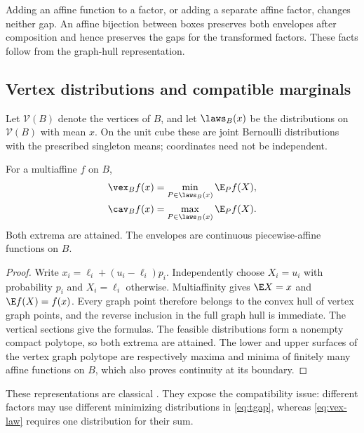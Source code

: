 Adding an affine function to a factor, or adding a separate affine factor,
changes neither gap. An affine bijection between boxes preserves both
envelopes after composition and hence preserves the gaps for the transformed
factors. These facts follow from the graph-hull representation.

\subsection{Vertex distributions and compatible marginals}
Let $\mathcal V(B)$ denote the vertices of $B$, and let $\laws_B(x)$ be
the distributions on $\mathcal V(B)$ with mean $x$. On the unit cube these
are joint Bernoulli distributions with the prescribed singleton means;
coordinates need not be independent.

\begin{lemma}\label{lem:vertex-law}
For a multiaffine $f$ on $B$,
\begin{align}
 \vex_B f(x)&=\min_{P\in\laws_B(x)}\E_P f(X),\label{eq:vex-law}\\
 \cav_B f(x)&=\max_{P\in\laws_B(x)}\E_P f(X).\label{eq:cav-law}
\end{align}
Both extrema are attained. The envelopes are continuous piecewise-affine
functions on $B$.
\end{lemma}
\begin{proof}
Write $x_i=\ell_i+(u_i-\ell_i)p_i$. Independently choose $X_i=u_i$ with
probability $p_i$ and $X_i=\ell_i$ otherwise. Multiaffinity gives
$\E X=x$ and $\E f(X)=f(x)$. Every graph point therefore belongs to the
convex hull of vertex graph points, and the reverse inclusion in the full
graph hull is immediate. The vertical sections give the formulas. The
feasible distributions form a nonempty compact polytope, so both extrema
are attained. The lower and upper surfaces of the vertex graph polytope
are respectively maxima and minima of finitely many affine functions on
$B$, which also proves continuity at its boundary.
\end{proof}

These representations are classical \citep[Section 3]{Luedtke2012}.
They expose the compatibility issue: different factors may use different
minimizing distributions in \eqref{eq:tgap}, whereas \eqref{eq:vex-law}
requires one distribution for their sum.

